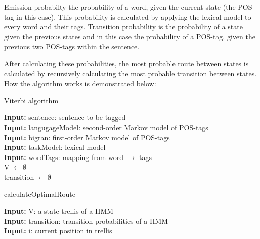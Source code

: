 \documentclass[10pt, a4paper]{article}
\begin{document}
Emission probabilty the probability of a word, given the current state (the POS-tag in this case). This probability is calculated by applying the lexical model to every word and their tags. Transition probability is the probability of a state given the previous states and in this case the probability of a POS-tag, given the previous two POS-tags within the sentence.

After calculating these probabilities, the most probable route between states is calculated by recursively calculating the most probable transition between states. How the algorithm works is demonstrated below:\\


\begin{algorithm}[H]
\caption{Viterbi algorithm}
\SetAlgoLined
\textbf{Input:} sentence: sentence to be tagged\\
\textbf{Input:} langugageModel: second-order Markov model of POS-tags\\
\textbf{Input:} bigran: first-order Markov model of POS-tags\\
\textbf{Input:} taskModel: lexical model\\
\textbf{Input:} wordTags: mapping from word $\rightarrow$ tags\\
V $\leftarrow \emptyset$\\
transition $\leftarrow \emptyset$\\
\end{algorithm}


\begin{algorithm}[H]
\caption{calculateOptimalRoute}
\textbf{Input:} V: a state trellis of a HMM\\
\textbf{Input:} transition: transition probabilities of a HMM\\
\textbf{Input:} i: current position in trellis\\


\end{algorithm}
\end{document}
